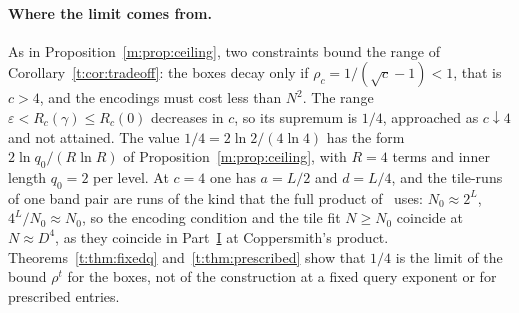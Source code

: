\documentclass[11pt]{article}
\theoremstyle{definition}
\theoremstyle{remark}
\newcommand{\Nz}{N_0}
\begin{document}
\paragraph{Where the limit comes from.} As in Proposition~\ref{m:prop:ceiling}, two constraints bound the range of Corollary~\ref{t:cor:tradeoff}: the boxes decay only if $\rho_c=1/(\sqrt c-1)<1$, that is $c>4$, and the encodings must cost less than $N^2$. The range $\varepsilon<R_c(\gamma)\le R_c(0)$ decreases in $c$, so its supremum is $1/4$, approached as $c\downarrow4$ and not attained. The value $1/4=2\ln2/(4\ln4)$ has the form $2\ln q_0/(R\ln R)$ of Proposition~\ref{m:prop:ceiling}, with $R=4$ terms and inner length $q_0=2$ per level. At $c=4$ one has $a=L/2$ and $d=L/4$, and the tile-runs of one band pair are runs of the kind that the full product of~\cite[Theorem~1.1(a)]{Maj26b} uses: $\Nz\approx2^L$, $4^L/\Nz\approx\Nz$, so the encoding condition and the tile fit $N\ge\Nz$ coincide at $N\approx D^4$, as they coincide in Part~\hyperref[m:partI]{I} at Coppersmith's product. Theorems~\ref{t:thm:fixedq} and~\ref{t:thm:prescribed} show that $1/4$ is the limit of the bound $\rho^t$ for the boxes, not of the construction at a fixed query exponent or for prescribed entries.
\end{document}

